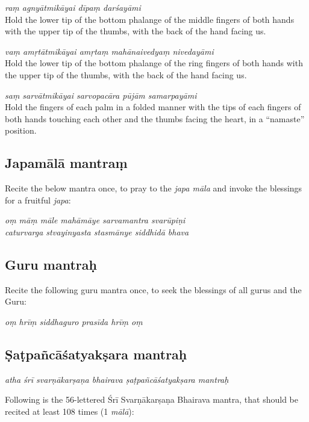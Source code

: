 \documentclass[11pt,oneside,a4paper]{article}
\newenvironment{shloka}[1]
  {\bigskip\center#1\varwidth{\linewidth}}
  {\endvarwidth\endcenter\bigskip}
\newcommand{\tl}[1]{\emph{#1}}
\begin{document}
\tl{raṃ agnyātmikāyai dīpaṃ darśayāmi}\\
Hold the lower tip of the bottom phalange of the middle fingers of both hands
with the upper tip of the thumbs, with the back of the hand facing us.

\tl{vaṃ amṛtātmikāyai amṛtaṃ mahānaivedyaṃ nivedayāmi}\\
Hold the lower tip of the bottom phalange of the ring fingers of both hands with
the upper tip of the thumbs, with the back of the hand facing us.

\tl{saṃ sarvātmikāyai sarvopacāra pūjām samarpayāmi}\\
Hold the fingers of each palm in a folded manner with the tips of each fingers
of both hands touching each other and the thumbs facing the heart, in
a ``namaste'' position.

\subsection{Japamālā mantraṃ}

Recite the below mantra once, to pray to the \tl{japa māla} and invoke
the blessings for a fruitful \tl{japa}:

\begin{shloka}\itshape
  oṃ māṃ māle mahāmāye sarvamantra svarūpiṇi\\
  caturvarga stvayinyasta stasmānye siddhidā bhava
\end{shloka}

\subsection{Guru mantraḥ}

Recite the following guru mantra once, to seek the blessings of all gurus and
the Guru:

\begin{shloka}\itshape
  oṃ hrīṃ siddhaguro prasīda hrīṃ oṃ
\end{shloka}

\subsection{Ṣaṭpañcāśatyakṣara mantraḥ}

\begin{shloka}\itshape
  atha śrī svarṇākarṣaṇa bhairava ṣaṭpañcāśatyakṣara mantraḥ
\end{shloka}

Following is the 56-lettered Śrī Svarṇākarṣaṇa Bhairava mantra, that should be
recited at least 108 times (1 \tl{mālā}):
\end{document}
